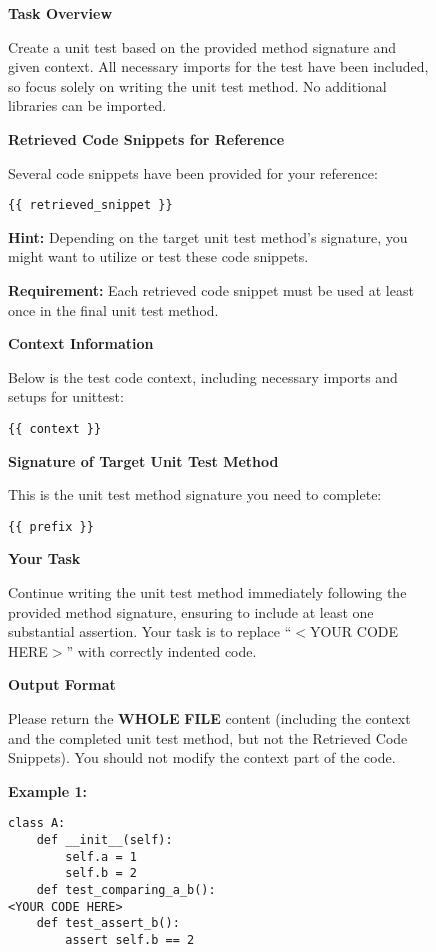\begin{figure}
    \centering
    \scriptsize
    \begin{tcolorbox}[colback=blue!5!white, colframe=blue!75!black]

\textbf{Task Overview}

Create a unit test based on the provided method signature and given context. All necessary imports for the test have been included, so focus solely on writing the unit test method. No additional libraries can be imported.

\textbf{Retrieved Code Snippets for Reference}

Several code snippets have been provided for your reference:
\begin{verbatim}
{{ retrieved_snippet }}
\end{verbatim}

\textbf{Hint:} Depending on the target unit test method's signature, you might want to utilize or test these code snippets. 

\textbf{Requirement:} Each retrieved code snippet must be used at least once in the final unit test method.

\textbf{Context Information}

Below is the test code context, including necessary imports and setups for unittest:
\begin{verbatim}
{{ context }}
\end{verbatim}

\textbf{Signature of Target Unit Test Method}

This is the unit test method signature you need to complete:
\begin{verbatim}
{{ prefix }}
\end{verbatim}

\textbf{Your Task}

Continue writing the unit test method immediately following the provided method signature, ensuring to include at least one substantial assertion. Your task is to replace ``$<$YOUR CODE HERE$>$'' with correctly indented code.

\textbf{Output Format}

Please return the \textbf{WHOLE} \textbf{FILE} content (including the context and the completed unit test method, but not the Retrieved Code Snippets). You should not modify the context part of the code.

\textbf{Example 1:}
\begin{verbatim}
class A:
    def __init__(self):
        self.a = 1
        self.b = 2
    def test_comparing_a_b():
<YOUR CODE HERE>
    def test_assert_b():
        assert self.b == 2
\end{verbatim}


\end{tcolorbox}
\end{figure}
